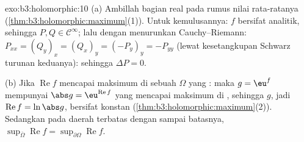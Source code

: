 \begin{solution}{exo:b3:holomorphic:10}
(a) Ambillah bagian real pada rumus nilai rata-ratanya
(\cref{thm:b3:holomorphic:maximum}(1)). Untuk kemulusannya: $f$ bersifat
analitik, sehingga $P, Q \in \mathcal C^\infty$; lalu dengan menurunkan
Cauchy--Riemann: $P_{xx} = (Q_y)_x = (Q_x)_y = (-P_y)_y =
-P_{yy}$ (lewat kesetangkupan Schwarz turunan keduanya): sehingga $\Delta P =
0$.

(b) Jika $\operatorname{Re}f$ mencapai maksimum di  sebuah
$\Omega$ yang : maka $g = \eu^f$ mempunyai $\abs g =
\eu^{\operatorname{Re}f}$ yang mencapai maksimum di , sehingga
$g$, jadi $\operatorname{Re}f = \ln\abs g$, bersifat konstan
(\cref{thm:b3:holomorphic:maximum}(2)). Sedangkan pada daerah terbatas
dengan  sampai batasnya,
$\sup_{\bar\Omega}\operatorname{Re}f =
\sup_{\partial\Omega}\operatorname{Re}f$.
\end{solution}

